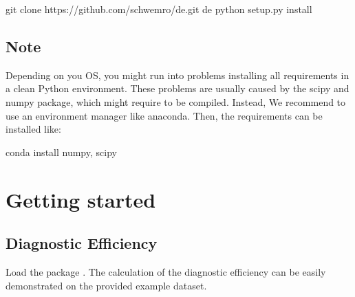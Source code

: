 \documentclass[letterpaper,10pt,english]{sphinxmanual}
\begin{document}
\begin{sphinxVerbatim}[commandchars=\\\{\}]
git clone https://github.com/schwemro/de.git
 de
python setup.py install
\end{sphinxVerbatim}


\subsection{Note}
\label{\detokenize{install:note}}
Depending on you OS, you might run into problems installing all requirements
in a clean Python environment. These problems are usually caused by the scipy
and numpy package, which might require to be compiled. Instead, We recommend to
use an environment manager like anaconda.
Then, the requirements can be installed like:

\begin{sphinxVerbatim}[commandchars=\\\{\}]
conda install numpy, scipy
\end{sphinxVerbatim}


\section{Getting started}
\label{\detokenize{getting_started:getting-started}}\label{\detokenize{getting_started::doc}}

\subsection{Diagnostic Efficiency}
\label{\detokenize{getting_started:diagnostic-efficiency}}
Load the package . The calculation of the diagnostic efficiency
can be easily demonstrated on the provided example dataset.
\end{document}
